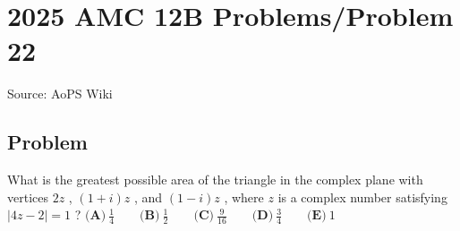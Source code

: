 \documentclass[12pt]{article}
\begin{document}
\section*{{2025 AMC 12B Problems/Problem 22}}
Source: AoPS Wiki

\subsection*{Problem}
What is the greatest possible area of the triangle in the complex plane with vertices $2z$ , $(1+i)z$ , and $(1-i)z$ , where $z$ is a complex number satisfying $|4z - 2| = 1$ ? $\textbf{(A)}~\frac 14 \qquad \textbf{(B)}~\frac 12 \qquad \textbf{(C)}~\frac{9}{16} \qquad \textbf{(D)}~\frac 34 \qquad \textbf{(E)}~1$
\end{document}
